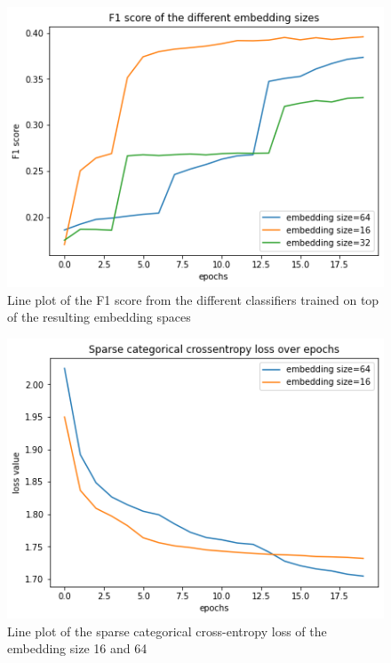 \documentclass[twocolumn]{article}
\begin{document}
\begin{figure}[t]
\centering
    \includegraphics[width=\linewidth]{assets/classifier_f1.png}
    \caption{Line plot of the F1 score from the different classifiers trained on top of the resulting embedding spaces}
    \label{fig:classifier-f1}
\end{figure}

\begin{figure}[t]
\centering
    \includegraphics[width=\linewidth]{assets/classifier_loss.png}
    \caption{Line plot of the sparse categorical cross-entropy loss of the embedding size 16 and 64}
    \label{fig:classifier-loss}
\end{figure}
\end{document}
